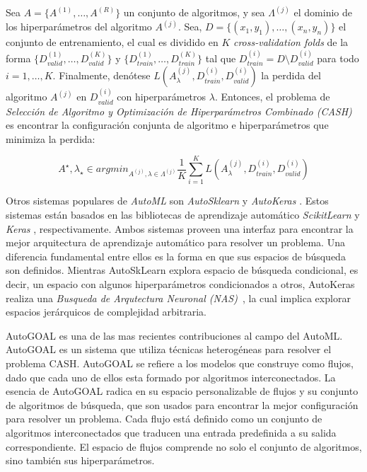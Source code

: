 \begin{definition}
\label{definition:cash}
    Sea $A = \{A^{(1)}, \dots, A^{(R)}\}$ un conjunto de algoritmos, y sea $\Lambda^{(j)}$ el dominio de los hiperparámetros del algoritmo $A^{(j)}$.
    Sea, $D = \{(x_1, y_1), \dots, (x_n, y_n)\}$ el conjunto de entrenamiento, el cual es dividido en $K$ \emph{cross-validation folds} de la forma $\{D_{valid}^{(1)}, \dots, D_{valid}^{(K)}\}$ y $\{D_{train}^{(1)}, \dots, D_{train}^{(K)}\}$ tal que $D_{train}^{(i)} = D \setminus D_{valid}^{(i)}$ para todo $i = 1, \dots, K$. Finalmente, denótese $L(A_{\lambda}^{(j)}, D_{train}^{(i)},D_{valid}^{(i)})$ la perdida del algoritmo $A^{(j)}$ en $D_{valid}^{(i)}$ con hiperparámetros $\lambda$.
    Entonces, el problema de \textit{Selección de Algoritmo y Optimización de Hiperparámetros Combinado (CASH)} es encontrar la configuración conjunta de algoritmo e hiperparámetros que minimiza la perdida:

    \begin{equation}
        A^{\star}, \lambda_{\star} \in argmin_{A^{(j)}, \lambda \in \Lambda^(j)} \frac{1}{K} \sum_{i=1}^K L(A_{\lambda}^{(j)}, D_{train}^{(i)},D_{valid}^{(i)})
    \end{equation}
\end{definition}

Otros sistemas populares de \emph{AutoML} son \emph{AutoSklearn} \parencite{feurer2015efficient} y \emph{AutoKeras} \parencite{autoKeras}.
Estos sistemas están basados en las bibliotecas de aprendizaje automático \emph{ScikitLearn} \parencite{pedregosa2011scikit} y \textit{Keras} \parencite{chollet2015keras}, respectivamente.
Ambos sistemas proveen una interfaz para encontrar la mejor arquitectura de aprendizaje automático para resolver un problema.
Una diferencia fundamental entre ellos es la forma en que sus espacios de búsqueda son definidos.
Mientras AutoSkLearn explora espacio de búsqueda condicional, es decir, un espacio con algunos hiperparámetros condicionados a otros, AutoKeras realiza una \emph{Busqueda de Arqutectura Neuronal (NAS)}~\parencite{NAS}, la cual implica explorar espacios jerárquicos de complejidad arbitraria.

AutoGOAL \parencite{autogoal, estevez2020general} es una de las mas recientes contribuciones al campo del AutoML. AutoGOAL es un sistema que utiliza técnicas heterogéneas para resolver el problema CASH.
AutoGOAL se refiere a los modelos que construye como flujos, dado que cada uno de ellos esta formado por algoritmos interconectados.
La esencia de AutoGOAL radica en su espacio personalizable de flujos y su conjunto de algoritmos de búsqueda, que son usados para encontrar la mejor configuración para resolver un problema.
Cada flujo está definido como un conjunto de algoritmos interconectados que traducen una entrada predefinida a su salida correspondiente.
El espacio de flujos comprende no solo el conjunto de algoritmos, sino también sus hiperparámetros.

